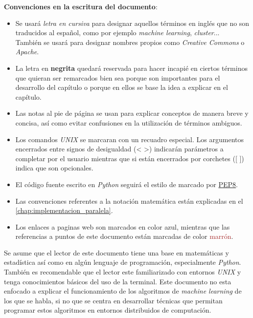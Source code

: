 \noindent \textbf{Convenciones en la escritura del documento}:
\begin{itemize}
  \item Se usará \textit{letra en cursiva} para designar aquellos términos en inglés que no son 
        traducidos al español, como por ejemplo \textit{machine learning}, \textit{cluster}...\\
        También se usará para designar nombres propios como \textit{Creative Commons} o \textit{Apache}.
  \item La letra en \textbf{negrita} quedará reservada para hacer incapié en ciertos términos que 
        quieran ser remarcados bien sea porque son importantes para el desarrollo del capítulo 
        o porque en ellos se base la idea a explicar en el capítulo.
  \item Las notas al pie de página se usan para explicar conceptos de manera breve y concisa, 
        así como evitar confusiones en la utilización de términos ambiguos.
  \item Los comandos \textit{UNIX} se marcaran con un recuadro especial. Los argumentos encerrados entre signos
        de desigualdad (< >) indicarán parámetros a completar por el usuario mientras que si están encerrados 
        por corchetes ([ ]) indica que son opcionales.
  \item El código fuente escrito en \textit{Python} seguirá el estilo de marcado por 
        \href{https://www.python.org/dev/peps/pep-0008/}{PEP8}.
  \item Las convenciones referentes a la notación matemática están explicadas en el 
        \autoref{chap:implementacion_paralela}.
  \item Los enlaces a paginas web son marcados en color \textcolor{blue!80!black}{azul}, mientras que 
        las referencias a puntos de este documento están marcadas de color %
        \textcolor{Brown}{marrón}.
\end{itemize}

\vspace*{0.5cm}

\noindent Se asume que el lector de este documento tiene una base en matemáticas y estadística así como en algún 
lenguaje de programación, especialmente \textit{Python}. También es recomendable que el lector este
familiarizado con entornos \textit{UNIX} y tenga conocimientos básicos del uso de la terminal.
Este documento no esta enfocado a explicar el funcionamiento de los algoritmos de \textit{machine learning} 
de los que se habla, si no que se centra en desarrollar técnicas que permitan programar estos algoritmos en 
entornos distribuidos de computación.
\newline

